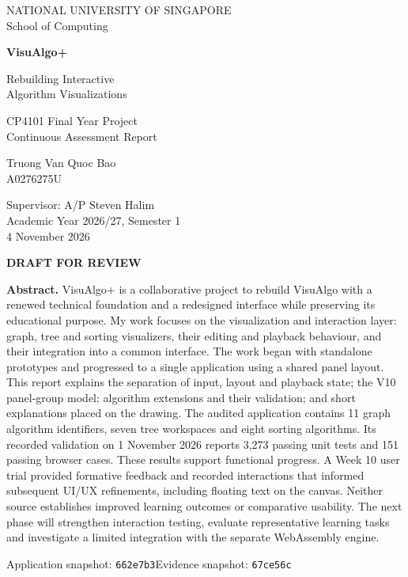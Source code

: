 \documentclass[11pt,a4paper]{article}
\newcommand{\code}[1]{\texttt{#1}}
\begin{document}
\begin{titlepage}
\centering
{\large NATIONAL UNIVERSITY OF SINGAPORE\\School of Computing\par}
\vspace{22mm}
{\Huge\bfseries\color{navy}VisuAlgo+\par}
\vspace{5mm}
{\LARGE Rebuilding Interactive\\Algorithm Visualizations\par}
\vspace{10mm}
{\Large CP4101 Final Year Project\\Continuous Assessment Report\par}
\vspace{12mm}
{\large Truong Van Quoc Bao\\A0276275U\par}
\vspace{7mm}
{Supervisor: A/P Steven Halim\\Academic Year 2026/27, Semester 1\\4 November 2026\par}
\vspace{9mm}
{\small\bfseries DRAFT FOR REVIEW\par}
\vspace{5mm}
\begin{minipage}{.94\textwidth}
\textbf{Abstract.} VisuAlgo+ is a collaborative project to rebuild VisuAlgo with a renewed technical foundation and a redesigned interface while preserving its educational purpose. My work focuses on the visualization and interaction layer: graph, tree and sorting visualizers, their editing and playback behaviour, and their integration into a common interface. The work began with standalone prototypes and progressed to a single application using a shared panel layout. This report explains the separation of input, layout and playback state; the V10 panel-group model; algorithm extensions and their validation; and short explanations placed on the drawing. The audited application contains 11 graph algorithm identifiers, seven tree workspaces and eight sorting algorithms. Its recorded validation on 1 November 2026 reports 3,273 passing unit tests and 151 passing browser cases. These results support functional progress. A Week 10 user trial provided formative feedback and recorded interactions that informed subsequent UI/UX refinements, including floating text on the canvas. Neither source establishes improved learning outcomes or comparative usability. The next phase will strengthen interaction testing, evaluate representative learning tasks and investigate a limited integration with the separate WebAssembly engine.
\end{minipage}
\vfill
{\small Application snapshot: \code{662e7b3}\quad\textbar\quad Evidence snapshot: \code{67ce56c}\par}
\end{titlepage}
\setcounter{page}{2}
\end{document}
